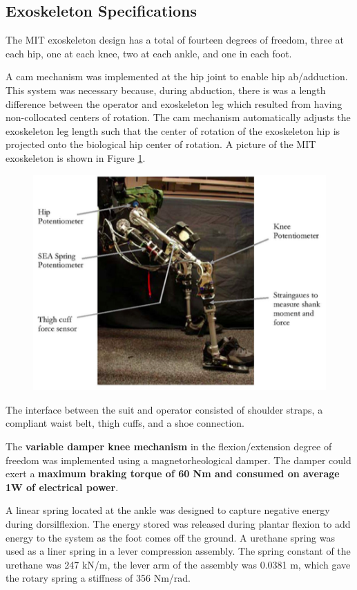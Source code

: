  \subsection{Exoskeleton Specifications}
 
 The MIT exoskeleton design has a total of fourteen degrees of freedom, three at each hip, one at each knee, two at each ankle, and one in each foot.
 
 A cam mechanism was implemented at the hip joint to enable hip ab/adduction.  This system was necessary because, during abduction, there is was a length difference between the operator and exoskeleton leg which resulted from having non-collocated centers of rotation.  The cam mechanism automatically adjusts the exoskeleton leg length such that the center of rotation of the exoskeleton hip is projected onto the biological hip center of rotation.  A picture of the MIT exoskeleton is shown in Figure \ref{fig:MITsuit}.
 \begin{figure}[thpb]
\centering
\includegraphics[width=3.in]{exos/figs/MIT/MITsuit}
  \caption{}
 \label{fig:MITsuit}   
 \end{figure} 
 
 The interface between the suit and operator consisted of shoulder straps, a compliant waist belt, thigh cuffs, and a shoe connection.  
 
 The {\bf variable damper knee mechanism} in the flexion/extension degree of freedom was implemented using a magnetorheological damper.  The damper could exert a {\bf maximum braking torque of 60 Nm and consumed on average 1W of electrical power}. 
 
 A linear spring located at the ankle was designed to capture negative energy during dorsilflexion.  The energy stored was released during plantar flexion to add energy to the system as the foot comes off the ground. A urethane spring was used as a liner spring in a lever compression assembly.  The spring constant of the urethane was 247 kN/m, the lever arm of the assembly was 0.0381 m, which gave the rotary spring a stiffness of 356 Nm/rad. 
 
